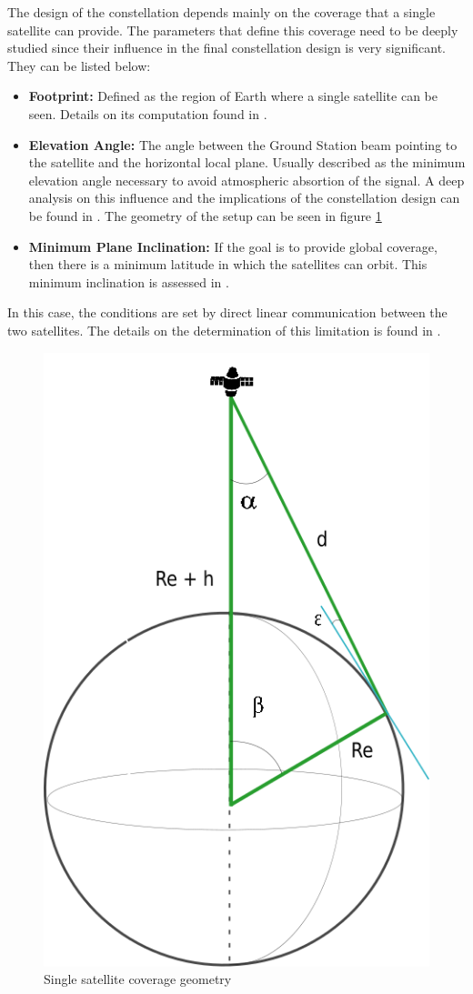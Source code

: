 The design of the constellation depends mainly on the coverage that a single satellite can provide. The parameters that define this coverage need to be deeply studied since their influence in the final constellation design is very significant. They can be listed below:

\begin{itemize}
\item \textbf{Footprint:} Defined as the region of Earth where a single satellite can
be seen. Details on its computation found in \cite[Chapter 2, Section 1]{annex1}. 
\item \textbf{Elevation Angle:} The angle between the Ground Station beam pointing to the satellite and the horizontal local plane. Usually described as the minimum elevation angle necessary to avoid atmospheric absortion of the signal. A deep analysis on this influence and the implications of the constellation design can be found in \cite[Chapter 2, Section 2]{annex1}. The geometry of the setup can be seen in figure \ref{fig:AngleSSatFoot}
\item \textbf{Minimum Plane Inclination: } If the goal is to provide global coverage, then there is a minimum latitude in which the satellites can orbit. This minimum inclination is assessed in \cite[Chapter 2, Section 3]{annex1}.
\end{itemize}

In this case, the conditions are set by direct linear communication between the two satellites. The details on the determination of this limitation is found in \cite[Chapter 2, Section 4]{annex1}.

\begin{figure}[H] %
	\centering
	\includegraphics[width=.3\textwidth]{./fig-Ch2-OrbitalCoverage/AngleSSatFoot.png}
	\caption{Single satellite coverage geometry}
	\label{fig:AngleSSatFoot}
	
\end{figure}
